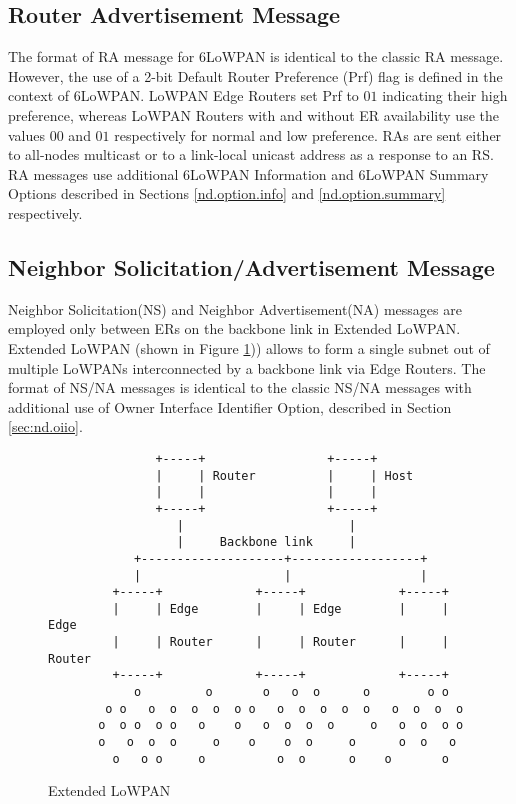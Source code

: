 \subsection{Router Advertisement Message}
The format of RA message for 6LoWPAN is identical to the classic \cite{rfc4861} RA message. However, the use of a 2-bit  Default Router Preference (Prf) flag \cite{rfc4191} is defined in the context of 6LoWPAN. LoWPAN Edge Routers set Prf to $01$ indicating their high preference, whereas LoWPAN Routers with and without ER availability use the values $00$ and $01$ respectively for normal and low preference. RAs are sent either to all-nodes multicast or to a link-local unicast address as a response to an RS. RA messages use additional 6LoWPAN Information and 6LoWPAN Summary Options described in Sections \ref{nd.option.info} and \ref{nd.option.summary} respectively.

\subsection{Neighbor Solicitation/Advertisement Message}
Neighbor Solicitation(NS) and Neighbor Advertisement(NA) messages are employed only between ERs on the backbone link in Extended LoWPAN. Extended LoWPAN (shown in Figure \ref{fig:ext.lowpan})) allows to form a single subnet out of multiple LoWPANs interconnected by a backbone link via Edge Routers. The format of NS/NA messages is identical to the classic NS/NA messages \cite{rfc4861} with additional use of Owner Interface Identifier Option, described in Section \ref{sec:nd.oiio}. 

\begin{figure}[htp]
\begin{mylisting}
\begin{verbatim}
               +-----+                 +-----+
               |     | Router          |     | Host
               |     |                 |     |
               +-----+                 +-----+
                  |                       |
                  |     Backbone link     |
            +--------------------+------------------+
            |                    |                  |
         +-----+             +-----+             +-----+
         |     | Edge        |     | Edge        |     | Edge
         |     | Router      |     | Router      |     | Router
         +-----+             +-----+             +-----+
            o         o       o   o  o      o        o o
        o o   o  o  o  o  o o   o  o  o  o  o   o  o  o  o
       o  o o  o o   o    o   o  o  o  o     o   o  o  o o
       o   o  o  o     o    o    o  o     o      o  o   o
         o   o o     o          o  o      o    o       o
\end{verbatim}
\end{mylisting}
\caption{Extended LoWPAN}\label{fig:ext.lowpan}
\end{figure}

